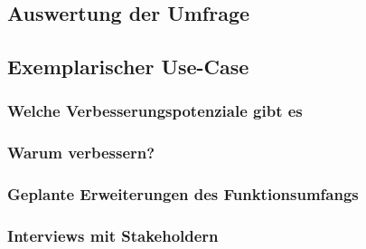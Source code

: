 \subsection{Auswertung der Umfrage}

\subsection{Exemplarischer Use-Case}

\subsubsection{Welche Verbesserungspotenziale gibt es}

\subsubsection{Warum verbessern?}

\subsubsection{Geplante Erweiterungen des Funktionsumfangs}

\subsubsection{Interviews mit Stakeholdern}